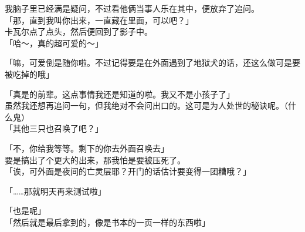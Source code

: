 我脑子里已经满是疑问，不过看他俩当事人乐在其中，便放弃了追问。\\

「那，直到我叫你出来，一直藏在里面，可以吧？」\\

卡瓦尔点了点头，然后便回到了影子中。\\

「哈～，真的超可爱的～」

「嘛，可爱倒是随你啦。不过记得要是在外面遇到了地狱犬的话，还这么做可是要被吃掉的哦」

「真是的前辈。这点事情我还是知道的啦。我又不是小孩子了」\\

虽然我还想再追问一句，但我绝对不会问出口的。这可是为人处世的秘诀呢。（什么鬼）\\

「其他三只也召唤了吧？」

「不，你给我等等。剩下的你去外面召唤去」\\

要是搞出了个更大的出来，那我怕是要被压死了。\\

「诶，可外面是夜间的亡灵层耶？开门的话估计要变得一团糟哦？」

「……那就明天再来测试啦」

「也是呢」\\

「然后就是最后拿到的，像是书本的一页一样的东西啦」\\

